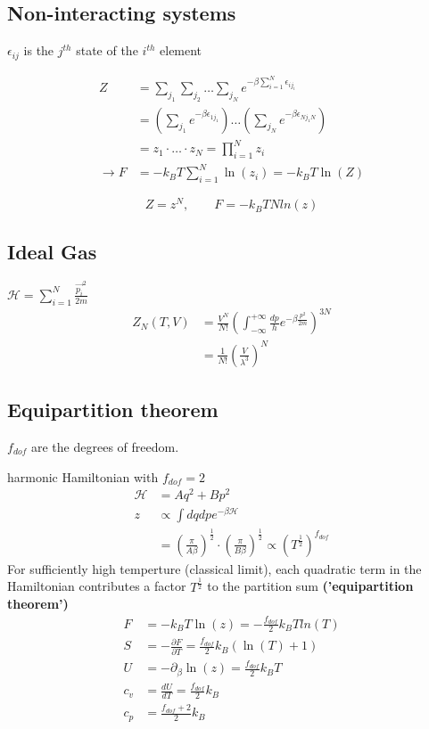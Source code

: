 \subsection*{Non-interacting systems}
$\epsilon_{ij}$ is the $j^{th}$ state of the $i^{th}$ element

\[
    \begin{aligned}
        Z &= \sum_{j_1} \sum_{j_2} \dots \sum_{j_N} e^{-\beta \sum_{i=1}^N \epsilon_{ij_i}} \\
        &= \left(\sum_{j_1} e^{-\beta \epsilon_{1j_1}}\right) \dots \left(\sum_{j_N} e^{-\beta \epsilon_{Nj_1N}}\right) \\
        &= z_1 \cdot \dots \cdot z_N = \prod_{i=1}^N z_i \\
        \rightarrow F &= -k_B T \sum_{i=1}^N \ln(z_i) = -k_B T \ln(Z)
    \end{aligned}
\]

\[
    Z = z^N , \qquad F = -k_B T N ln(z)
\]

\subsection*{Ideal Gas}
\(\mathcal{H} = \sum_{i=1}^N \frac{\vec{p_i}^2}{2m}\) \\
\[
    \begin{aligned}
        Z_N(T,V) &= \frac{V^N}{N!} \left(\int_{- \infty}^{+ \infty} \frac{dp}{h} e^{-\beta \frac{p^2}{2m}}\right)^{3N} \\
            &= \frac{1}{N!} \left(\frac{V}{\lambda^3}\right)^N
    \end{aligned}
\]

\subsection*{Equipartition theorem}
\(f_{dof}\) are the degrees of freedom.

harmonic Hamiltonian with $f_{dof}=2$
\[
    \begin{aligned}
        \mathcal{H} &= Aq^2 + Bp^2 \\
        z &\propto \int dq dp e^{-\beta \mathcal{H}} \\
        &= \left(\frac{\pi}{A\beta}\right)^{\frac{1}{2}} \cdot \left(\frac{\pi}{B \beta}\right)^{\frac{1}{2}} \propto \left(T^{\frac{1}{2}}\right)^{f_{dof}}
    \end{aligned}
\]
For sufficiently high temperture (classical limit), each quadratic term 
in the Hamiltonian contributes a factor \(T^{\frac{1}{2}}\) to the partition sum \textbf{('equipartition theorem')}
\[
    \begin{aligned}
        F &= -k_B T \ln(z) = - \frac{f_{dof}}{2} k_B T ln(T) \\
        S &= - \frac{\partial F}{\partial T} = \frac{f_{dof}}{2} k_B (\ln(T)+1) \\
        U &= - \partial_\beta \ln (z) = \frac{f_{dof}}{2} k_B T \\
        c_v &= \frac{dU}{dT} = \frac{f_{dof}}{2} k_B \\
        c_p &= \frac{f_{dof}+2}{2} k_B
    \end{aligned}
\]

